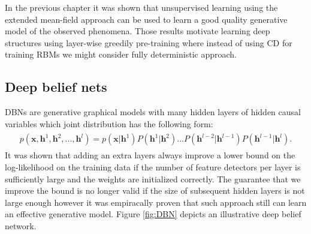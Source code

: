 In the previous chapter it was shown that unsupervised learning using the extended mean-field approach can be used to learn a good quality generative model of the observed phenomena. Those results motivate learning deep structures using layer-wise greedily pre-training where instead of using CD for training RBMs we might consider fully deterministic approach. 

\subsection{Deep belief nets}
DBNs are generative graphical models with many hidden layers of hidden
causal variables which joint distribution has the following form:
\begin{align}
\begin{split}
p(\mathbf{x}, \mathbf{h}^1, \mathbf{h}^2,..., \mathbf{h}^l) = p(\mathbf{x}| \mathbf{h}^1)P(\mathbf{h}^1|\mathbf{h}^2)...
P(\mathbf{h}^{l-2}|\mathbf{h}^{l-1})P(\mathbf{h}^{l-1}|\mathbf{h}^{l}).
\end{split}
\end{align}
It was shown that adding an extra layers always improve a lower bound on the log-likelihood on the training data if the number of feature detectors per layer is sufficiently large and the weights are initialized correctly.  The guarantee that we improve the bound is no longer valid if the size of subsequent hidden layers is not large enough however it was empiracally proven that such approach still can learn an effective generative model. Figure \ref{fig:DBN} depicts an illustrative deep belief network. 

